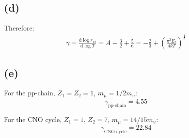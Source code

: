 \documentclass[a4paper,12pt]{article}
\renewcommand{\d}{\mathrm{d}}
\begin{document}
\subsection*{(d)}
Therefore:
\begin{align*}
    \gamma = \frac{\d \log r_{12}}{\d \log T} = A - \frac{3}{2} + \frac{5}{6} = -\frac{2}{3} + (\frac{\pi^2 E_*}{4kT})^{\frac{1}{3}}
\end{align*}

\subsection*{(e)}
For the pp-chain, $Z_1 = Z_2 = 1$, $m_\mu = 1/2 m_u$:
\begin{equation*}
    \gamma_{\text{pp-chain}} = 4.55
\end{equation*}

For the CNO cycle, $Z_1 = 1$, $Z_2 = 7$, $m_\mu = 14/15 m_u $:
\begin{equation*}
    \gamma_{\text{CNO cycle}} = 22.84
\end{equation*}
\end{document}
